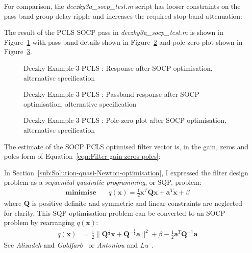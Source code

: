 \documentclass[a4paper,twoside,10pt,english]{report}
\begin{document}
For comparison, the \emph{deczky3a\_socp\_test.m} script has looser constraints
on the pass-band group-delay ripple and increases the required stop-band
attenuation:
\begin{small}

\end{small}
The result of the PCLS SOCP pass in \emph{deczky3a\_socp\_test.m} is shown in
Figure~\ref{fig:SOCP-Deczky-Example-3a-PCLS-d2} with pass-band details
shown in Figure~\ref{fig:SOCP-Deczky-Example-3a-PCLS-d2-passband} and 
pole-zero plot shown in Figure~\ref{fig:SOCP-Deczky-Example-3a-PCLS-d2-pz}.
\begin{figure}[!htbp]
\begin{center}
\scalebox{0.7}{}
\caption{Deczky Example 3 PCLS : Response after SOCP optimisation, alternative specification}
\label{fig:SOCP-Deczky-Example-3a-PCLS-d2}
\end{center}
\end{figure}
\begin{figure}[!htbp]
\begin{center}
\scalebox{0.7}{}
\caption{Deczky Example 3 PCLS : Passband response after SOCP optimisation, alternative specification}
\label{fig:SOCP-Deczky-Example-3a-PCLS-d2-passband}
\end{center}
\end{figure}
\begin{figure}[!htbp]
\begin{center}
\scalebox{0.7}{}
\caption{Deczky Example 3 PCLS : Pole-zero plot after SOCP optimisation, alternative specification}
\label{fig:SOCP-Deczky-Example-3a-PCLS-d2-pz}
\end{center}
\end{figure}
The estimate of the SOCP PCLS optimised filter vector is, in the gain,
zeros and poles form of Equation~\ref{eqn:Filter-gain-zeros-poles}:
\begin{small}

\end{small}

In Section~\ref{sub:Solution-quasi-Newton-optimisation}, I expressed the filter
design problem as a \emph{sequential quadratic programming}, or SQP, problem:
\begin{align*}
\textbf{minimise}\quad&q\left(\boldsymbol{x}\right)=
\frac{1}{2}\boldsymbol{x}^{T}\boldsymbol{Q}\boldsymbol{x}+
\boldsymbol{a}^{T}\boldsymbol{x}+\beta
\end{align*}
where $\boldsymbol{Q}$ is positive definite and symmetric and linear constraints
are neglected for clarity. This SQP optimisation problem can be converted to 
an SOCP problem by rearranging $q\left(\boldsymbol{x}\right)$:
\begin{align*}
q\left(\boldsymbol{x}\right)&=
\frac{1}{2}\|\boldsymbol{Q}^{\frac{1}{2}}\boldsymbol{x}+
\boldsymbol{Q}^{-\frac{1}{2}}\boldsymbol{a}\|^{2}+
\beta-\frac{1}{2}\boldsymbol{a}^{T}\boldsymbol{Q}^{-1}\boldsymbol{a}
\end{align*}
See \emph{Alizadeh} and 
\emph{Goldfarb}~\cite[Section 2.1]{AlizadehGoldfarb_SecondOrderCone} or
\emph{Antoniou} and 
\emph{Lu}~\cite[Section 14.7.2]{AntoniouLu_PracticalOptimization}. 
\end{document}
